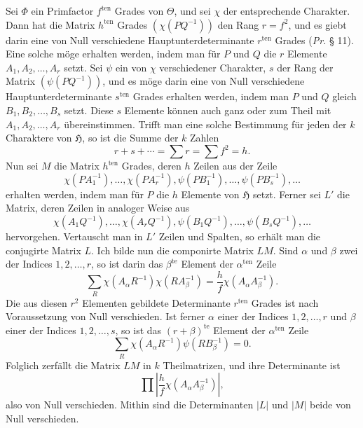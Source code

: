 \documentclass[11pt]{article}
\newcommand{\Hgrp}{\mathfrak{H}}
\newcommand{\ten}{\mathrm{ten}}
\newcommand{\te}{\mathrm{te}}
\begin{document}
Sei $\Phi$ ein Primfactor $f^{\ten}$ Grades von $\Theta$, und sei $\chi$ der entsprechende Charakter. Dann hat die Matrix $h^{\ten}$ Grades $(\chi(PQ^{-1}))$ den Rang $r=f^2$, und es giebt darin eine von Null verschiedene Hauptunterdeterminante $r^{\ten}$ Grades (\emph{Pr.} § 11). Eine solche möge erhalten werden, indem man für $P$ und $Q$ die $r$ Elemente $A_1,A_2,\ldots,A_r$ setzt. Sei $\psi$ ein von $\chi$ verschiedener Charakter, $s$ der Rang der Matrix $(\psi(PQ^{-1}))$, und es möge darin eine von Null verschiedene Hauptunterdeterminante $s^{\ten}$ Grades erhalten werden, indem man $P$ und $Q$ gleich $B_1,B_2,\ldots,B_s$ setzt. Diese $s$ Elemente können auch ganz oder zum Theil mit $A_1,A_2,\ldots,A_r$ übereinstimmen. Trifft man eine solche Bestimmung für jeden der $k$ Charaktere von $\Hgrp$, so ist die Summe der $k$ Zahlen
\[
r+s+\cdots=\sum r=\sum f^2=h.
\]
Nun sei $M$ die Matrix $h^{\ten}$ Grades, deren $h$ Zeilen aus der Zeile
\[
\chi(PA_1^{-1}),\ldots,\chi(PA_r^{-1}),\psi(PB_1^{-1}),\ldots,\psi(PB_s^{-1}),\ldots
\]
erhalten werden, indem man für $P$ die $h$ Elemente von $\Hgrp$ setzt. Ferner sei $L'$ die Matrix, deren Zeilen in analoger Weise aus
\[
\chi(A_1Q^{-1}),\ldots,\chi(A_rQ^{-1}),\psi(B_1Q^{-1}),\ldots,\psi(B_sQ^{-1}),\ldots
\]
hervorgehen. Vertauscht man in $L'$ Zeilen und Spalten, so erhält man die conjugirte Matrix $L$. Ich bilde nun die componirte Matrix $LM$. Sind $\alpha$ und $\beta$ zwei der Indices $1,2,\ldots,r$, so ist darin das $\beta^{\te}$ Element der $\alpha^{\ten}$ Zeile
\[
\sum_R\chi(A_\alpha R^{-1})\chi(RA_\beta^{-1})=\frac{h}{f}\chi(A_\alpha A_\beta^{-1}).
\]
Die aus diesen $r^2$ Elementen gebildete Determinante $r^{\ten}$ Grades ist nach Voraussetzung von Null verschieden. Ist ferner $\alpha$ einer der Indices $1,2,\ldots,r$ und $\beta$ einer der Indices $1,2,\ldots,s$, so ist das $(r+\beta)^{\te}$ Element der $\alpha^{\ten}$ Zeile
\[
\sum_R\chi(A_\alpha R^{-1})\psi(RB_\beta^{-1})=0.
\]
Folglich zerfällt die Matrix $LM$ in $k$ Theilmatrizen, und ihre Determinante ist
\[
\prod\left|\frac{h}{f}\chi(A_\alpha A_\beta^{-1})\right|,
\]
also von Null verschieden. Mithin sind die Determinanten $|L|$ und $|M|$ beide von Null verschieden.
\end{document}
